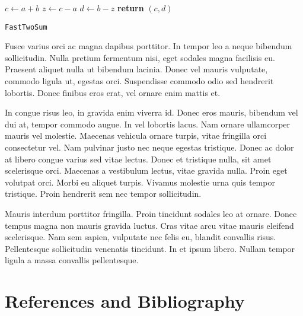 \documentclass{article}
\begin{document}
\begin{center}
	\begin{minipage}{0.5\linewidth} %
		\begin{algorithm}[H]
			\medskip
			$c \leftarrow a + b$ \;
			$z \leftarrow c - a$ \;
			$d \leftarrow b - z$ \;
			{\bf return} $(c,d)$ \;
			\caption{\texttt{FastTwoSum}} %
			\label{alg:fastTwoSum}   %
		\end{algorithm}
	\end{minipage}
\end{center}

Fusce varius orci ac magna dapibus porttitor. In tempor leo a neque bibendum sollicitudin. Nulla pretium fermentum nisi, eget sodales magna facilisis eu. Praesent aliquet nulla ut bibendum lacinia. Donec vel mauris vulputate, commodo ligula ut, egestas orci. Suspendisse commodo odio sed hendrerit lobortis. Donec finibus eros erat, vel ornare enim mattis et.

\begin{question}
	In congue risus leo, in gravida enim viverra id. Donec eros mauris, bibendum vel dui at, tempor commodo augue. In vel lobortis lacus. Nam ornare ullamcorper mauris vel molestie. Maecenas vehicula ornare turpis, vitae fringilla orci consectetur vel. Nam pulvinar justo nec neque egestas tristique. Donec ac dolor at libero congue varius sed vitae lectus. Donec et tristique nulla, sit amet scelerisque orci. Maecenas a vestibulum lectus, vitae gravida nulla. Proin eget volutpat orci. Morbi eu aliquet turpis. Vivamus molestie urna quis tempor tristique. Proin hendrerit sem nec tempor sollicitudin.
\end{question}

Mauris interdum porttitor fringilla. Proin tincidunt sodales leo at ornare. Donec tempus magna non mauris gravida luctus. Cras vitae arcu vitae mauris eleifend scelerisque. Nam sem sapien, vulputate nec felis eu, blandit convallis risus. Pellentesque sollicitudin venenatis tincidunt. In et ipsum libero. Nullam tempor ligula a massa convallis pellentesque.



\section{References and Bibliography}
\printbibliography[heading=none]
\end{document}
